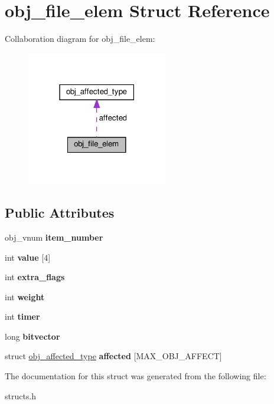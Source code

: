 \hypertarget{structobj__file__elem}{}\section{obj\+\_\+file\+\_\+elem Struct Reference}
\label{structobj__file__elem}


Collaboration diagram for obj\+\_\+file\+\_\+elem\+:
\nopagebreak
\begin{figure}[H]
\begin{center}
\leavevmode
\includegraphics[width=174pt]{structobj__file__elem__coll__graph}
\end{center}
\end{figure}
\subsection*{Public Attributes}
\begin{DoxyCompactItemize}
\item 
\mbox{\label{structobj__file__elem_a8d9169c18ed7b6508b126657cbc19884}} 
obj\+\_\+vnum {\bfseries item\+\_\+number}
\item 
\mbox{\label{structobj__file__elem_af87dd81fe64f9ea1332e720f497185b3}} 
int {\bfseries value} \mbox{[}4\mbox{]}
\item 
\mbox{\label{structobj__file__elem_ad44004f327e4502b17483e5501554bff}} 
int {\bfseries extra\+\_\+flags}
\item 
\mbox{\label{structobj__file__elem_a682a8a10682c730924f86f0d55e0cda4}} 
int {\bfseries weight}
\item 
\mbox{\label{structobj__file__elem_a9e7444dc2029cb77c79b8332c99b31a5}} 
int {\bfseries timer}
\item 
\mbox{\label{structobj__file__elem_a08aeb39579a58670822fdf6108b45f4f}} 
long {\bfseries bitvector}
\item 
\mbox{\label{structobj__file__elem_a9a53825c64ff6a5e16519f94ad383851}} 
struct \hyperlink{structobj__affected__type}{obj\+\_\+affected\+\_\+type} {\bfseries affected} \mbox{[}M\+A\+X\+\_\+\+O\+B\+J\+\_\+\+A\+F\+F\+E\+CT\mbox{]}
\end{DoxyCompactItemize}


The documentation for this struct was generated from the following file\+:\begin{DoxyCompactItemize}
\item 
structs.\+h\end{DoxyCompactItemize}
